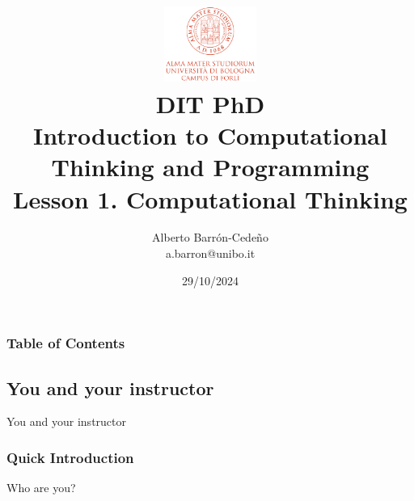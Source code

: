 \documentclass[xcolor=x11names]{beamer}
\title[DIT, LM SpecTra]{\vspace{-2pt}\\
\href{http://www.dit.unibo.it}{\includegraphics[width=30mm]{img/UNIBO_logo.png}
} \\
\vspace{6mm} {DIT PhD\\ Introduction to Computational Thinking and Programming} 
\\
{\large Lesson 1. Computational Thinking}\vspace{-5mm}}
\author[A. Barr\'on-Cede\~no]{{Alberto Barr\'on-Cede\~no \\ a.barron@unibo.it
\vspace{-8mm}}
\institute[DIT-UniBO]{DIT-UniBO}}
\date[2024]{29/10/2024}
\begin{document}
{%
	\begin{frame}[plain]
		\titlepage
	\end{frame}
}

\begin{frame}
\frametitle{Table of Contents}
\tableofcontents
\end{frame}

\begin{frame}
\section{You and your instructor}
\centering
\alert{You and your instructor}
\end{frame}

\begin{frame}
\frametitle{Quick Introduction}

Who are you?
\end{frame}
\end{document}

